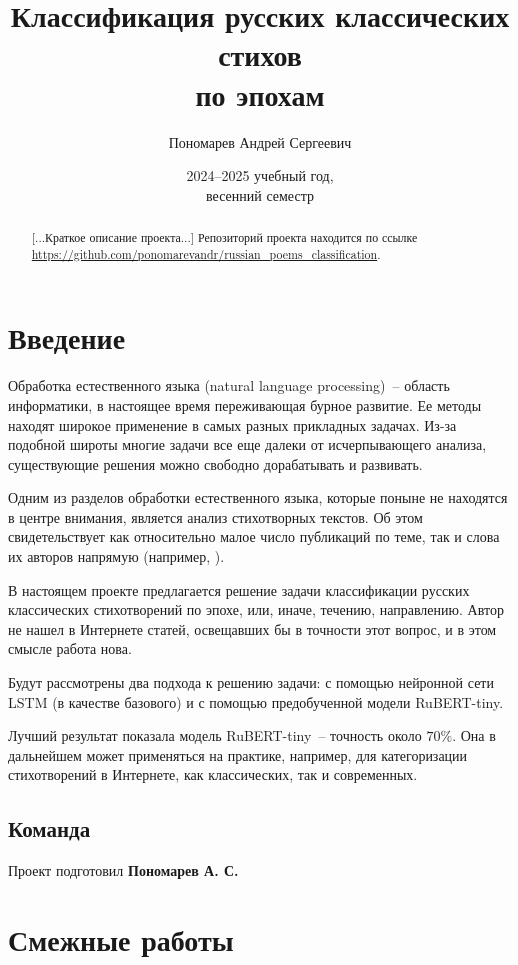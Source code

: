 \documentclass[a4paper,12pt]{article}
\title{Классификация русских классических стихов \\ по эпохам}
\author{Пономарев Андрей Сергеевич}
\date{2024--2025 учебный год, \\ весенний семестр}
\newcommand{\absent}[1]{[...#1...]}
\begin{document}
\maketitle

\begin{abstract}
    \absent{Краткое описание проекта} Репозиторий проекта находится по ссылке \\
    \url{https://github.com/ponomarevandr/russian_poems_classification}.
\end{abstract}



\section{Введение}

Обработка естественного языка (natural language processing)~-- область информатики, в настоящее время переживающая бурное развитие. Ее методы находят широкое применение в самых разных прикладных задачах. Из-за подобной широты многие задачи все еще далеки от исчерпывающего анализа, существующие решения можно свободно дорабатывать и развивать.

Одним из разделов обработки естественного языка, которые поныне не находятся в центре внимания, является анализ стихотворных текстов. Об этом свидетельствует как относительно малое число публикаций по теме, так и слова их авторов напрямую (например, \cite{barbado2021}).

В настоящем проекте предлагается решение задачи классификации русских классических стихотворений по эпохе, или, иначе, течению, направлению. Автор не нашел в Интернете статей, освещавших бы в точности этот вопрос, и в этом смысле работа нова.

Будут рассмотрены два подхода к решению задачи: с помощью нейронной сети LSTM (в качестве базового) и с помощью предобученной модели RuBERT-tiny.

Лучший результат показала модель RuBERT-tiny~-- точность около $70 \%$. Она в дальнейшем может применяться на практике, например, для категоризации стихотворений в Интернете, как классических, так и современных.


\subsection{Команда}

Проект подготовил \textbf{Пономарев А. С.}


\section{Смежные работы}
\end{document}
